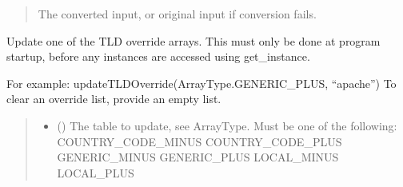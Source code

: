 \documentclass[letterpaper,10pt,english]{sphinxmanual}
\begin{document}
\begin{fulllineitems}
\begin{fulllineitems}
\begin{quote}
\begin{description}
\sphinxAtStartPar
The converted input, or original input if conversion fails.

\end{description}\end{quote}

\end{fulllineitems}


\begin{fulllineitems}
\label{\detokenize{apache_commons_validator_python.routines:apache_commons_validator_python.routines.domain_validator.DomainValidator.update_tld_override}}
\pysigstartsignatures
{}
\pysigstopsignatures
\sphinxAtStartPar
Update one of the TLD override arrays. This must only be done at program
startup, before any instances are accessed using get\_instance.

\sphinxAtStartPar
For example:
updateTLDOverride(ArrayType.GENERIC\_PLUS, “apache”)
To clear an override list, provide an empty list.
\begin{quote}\begin{description}
\begin{itemize}
\item {} 
\sphinxAtStartPar
{} ({\hyperref[\detokenize{apache_commons_validator_python.routines:apache_commons_validator_python.routines.domain_validator.DomainValidator.ArrayType}]{}}) \textendash{} The table to update, see ArrayType. Must be one of the following:
\sphinxhyphen{} COUNTRY\_CODE\_MINUS
\sphinxhyphen{} COUNTRY\_CODE\_PLUS
\sphinxhyphen{} GENERIC\_MINUS
\sphinxhyphen{} GENERIC\_PLUS
\sphinxhyphen{} LOCAL\_MINUS
\sphinxhyphen{} LOCAL\_PLUS


\end{itemize}
\end{description}
\end{quote}
\end{fulllineitems}
\end{fulllineitems}
\end{document}
